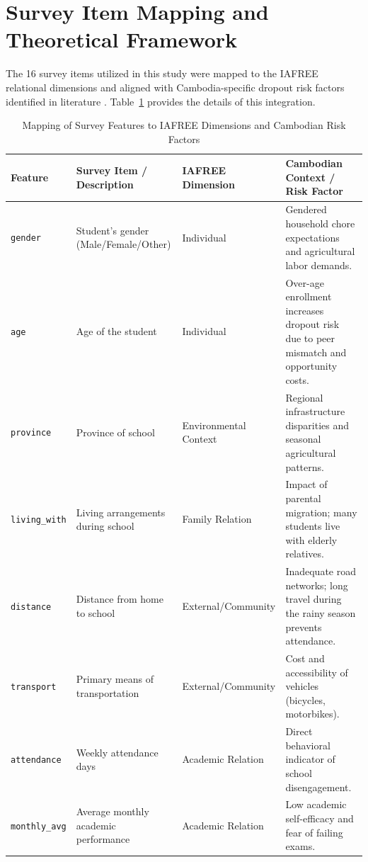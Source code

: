 \documentclass[12pt,journal,compsoc]{IEEEtran}
\begin{document}
\section{Survey Item Mapping and Theoretical Framework}
\label{sec:survey_mapping}
The 16 survey items utilized in this study were mapped to the IAFREE relational dimensions \cite{vasconcelos2023iafree} and aligned with Cambodia-specific dropout risk factors identified in literature \cite{kreng2016school}. Table~\ref{tab:survey_mapping} provides the details of this integration.

\begin{table}[t]
\centering
\caption{Mapping of Survey Features to IAFREE Dimensions and Cambodian Risk Factors}
\label{tab:survey_mapping}
\begin{tabular}{lp{4cm}p{4cm}p{4cm}}
\toprule
\textbf{Feature} & \textbf{Survey Item / Description} & \textbf{IAFREE Dimension} & \textbf{Cambodian Context / Risk Factor} \\
\midrule
\texttt{gender} & Student's gender (Male/Female/Other) & Individual & Gendered household chore expectations and agricultural labor demands. \\
\texttt{age} & Age of the student & Individual & Over-age enrollment increases dropout risk due to peer mismatch and opportunity costs. \\
\texttt{province} & Province of school & Environmental Context & Regional infrastructure disparities and seasonal agricultural patterns. \\
\texttt{living\_with} & Living arrangements during school & Family Relation & Impact of parental migration; many students live with elderly relatives. \\
\texttt{distance} & Distance from home to school & External/Community & Inadequate road networks; long travel during the rainy season prevents attendance. \\
\texttt{transport} & Primary means of transportation & External/Community & Cost and accessibility of vehicles (bicycles, motorbikes). \\
\texttt{attendance} & Weekly attendance days & Academic Relation & Direct behavioral indicator of school disengagement. \\
\texttt{monthly\_avg} & Average monthly academic performance & Academic Relation & Low academic self-efficacy and fear of failing exams. \\

\end{tabular}
\end{table}
\end{document}
